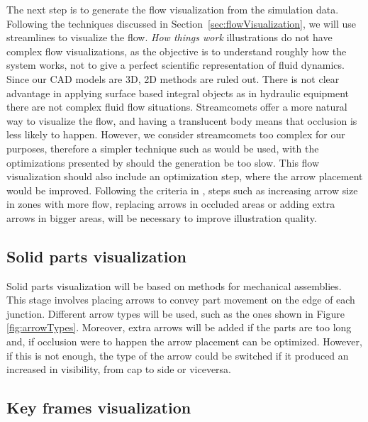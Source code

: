 The next step is to generate the flow visualization from the simulation data.
Following the techniques discussed in Section~\ref{sec:flowVisualization}, we will use streamlines to visualize the flow.
\textit{How things work} illustrations do not have complex flow visualizations, as the objective is to understand roughly how the system works, not to give a perfect scientific representation of fluid dynamics.
Since our CAD models are 3D, 2D methods are ruled out.
There is not clear advantage in applying surface based integral objects as in hydraulic equipment there are not complex fluid flow situations.
Streamcomets offer a more natural way to visualize the flow, and having a translucent body means that occlusion is less likely to happen.
However, we consider streamcomets too complex for our purposes, therefore a simpler technique such as \cite{Wicke2009} would be used, with the optimizations presented by \cite{McLoughlin2013} should the generation be too slow.
This flow visualization should also include an optimization step, where the arrow placement would be improved.
Following the criteria in \cite{Mitra2010}, steps such as increasing arrow size in zones with more flow, replacing arrows in occluded areas or adding extra arrows in bigger areas, will be necessary to improve illustration quality.

\subsection{Solid parts visualization}

Solid parts visualization will be based on \cite{Mitra2010} methods for mechanical assemblies.
This stage involves placing arrows to convey part movement on the edge of each junction.
Different arrow types will be used, such as the ones shown in Figure \ref{fig:arrowTypes}.
Moreover, extra arrows will be added if the parts are too long and, if occlusion were to happen the arrow placement can be optimized.
However, if this is not enough, the type of the arrow could be switched if it produced an increased in visibility, from cap to side or viceversa.

\subsection{Key frames visualization}

